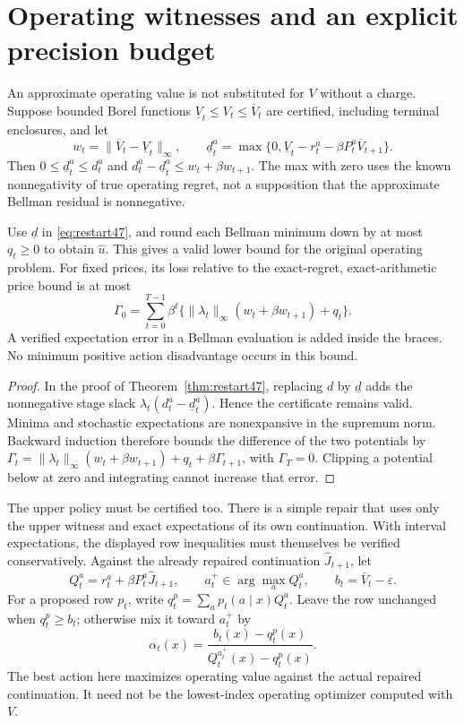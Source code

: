 \section{Operating witnesses and an explicit precision budget}\label{sec:witness47}
An approximate operating value is not substituted for $V$ without a charge. Suppose bounded Borel functions $\underline V_t\le V_t\le\overline V_t$ are certified, including terminal enclosures, and let
\[
 w_t=\|\overline V_t-\underline V_t\|_\infty,\qquad
 \underline d_t^a=\max\{0,\underline V_t-r_t^a-\beta P_t^a\overline V_{t+1}\}.
\]
Then $0\le\underline d_t^a\le d_t^a$ and
$d_t^a-\underline d_t^a\le w_t+\beta w_{t+1}$. The max with zero uses the known nonnegativity of true operating regret, not a supposition that the approximate Bellman residual is nonnegative.

\begin{proposition}\label{prop:witnesslower47}
Use $\underline d$ in \eqref{eq:restart47}, and round each Bellman minimum down by at most $q_t\ge0$ to obtain $\widehat u$. This gives a valid lower bound for the original operating problem. For fixed prices, its loss relative to the exact-regret, exact-arithmetic price bound is at most
\begin{equation}\label{eq:witnessbudget47}
 \Gamma_0=\sum_{t=0}^{T-1}\beta^t
 \{\|\lambda_t\|_\infty(w_t+\beta w_{t+1})+q_t\}.
\end{equation}
A verified expectation error in a Bellman evaluation is added inside the braces. No minimum positive action disadvantage occurs in this bound.
\end{proposition}
\begin{proof}
In the proof of Theorem~\ref{thm:restart47}, replacing $d$ by $\underline d$ adds the nonnegative stage slack $\lambda_t(d_t^a-\underline d_t^a)$. Hence the certificate remains valid. Minima and stochastic expectations are nonexpansive in the supremum norm. Backward induction therefore bounds the difference of the two potentials by $\Gamma_t=\|\lambda_t\|_\infty(w_t+\beta w_{t+1})+q_t+\beta\Gamma_{t+1}$, with $\Gamma_T=0$. Clipping a potential below at zero and integrating cannot increase that error.
\end{proof}

The upper policy must be certified too. There is a simple repair that uses only the upper witness and exact expectations of its own continuation. With interval expectations, the displayed row inequalities must themselves be verified conservatively. Against the already repaired continuation $\widehat J_{t+1}$, let
\[
 Q_t^a=r_t^a+\beta P_t^a\widehat J_{t+1},\qquad
 a_t^+\in\arg\max_a Q_t^a,\qquad b_t=\overline V_t-\varepsilon.
\]
For a proposed row $p_t$, write $q_t^p=\sum_a p_t(a\mid x)Q_t^a$. Leave the row unchanged when $q_t^p\ge b_t$; otherwise mix it toward $a_t^+$ by
\begin{equation}\label{eq:witnessrepair47}
 \alpha_t(x)=\frac{b_t(x)-q_t^p(x)}{Q_t^{a_t^+}(x)-q_t^p(x)}.
\end{equation}
The best action here maximizes operating value against the actual repaired continuation. It need not be the lowest-index operating optimizer computed with $V$.

